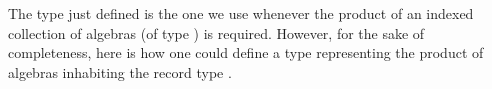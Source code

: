 \ccpad
The type just defined is the one we use whenever the product of an indexed collection of algebras (of type ) is required.  However, for the sake of completeness, here is how one could define a type representing the product of algebras inhabiting the record type .
\ccpad
\begin{code}%
\>[0][@{}l@{\AgdaIndent{0}}]%
\>[1]\AgdaSpace{}%
\AgdaSymbol{:}\AgdaSpace{}%
\AgdaSymbol{(}\AgdaSpace{}%
\AgdaSymbol{:}\AgdaSpace{}%
\AgdaSpace{}%
\AgdaSpace{}%
\AgdaSpace{}%
\AgdaSpace{}%
\AgdaSymbol{)}\AgdaSpace{}%
\AgdaSpace{}%
\AgdaSpace{}%
\AgdaSymbol{(}\AgdaSpace{}%
\AgdaSpace{}%
\AgdaSymbol{)}\AgdaSpace{}%
\<%
\\
%
\>[1]\AgdaSpace{}%
\AgdaSpace{}%
\AgdaSymbol{=}\AgdaSpace{}%
%
\>[100I]\AgdaSymbol{\{}\AgdaSpace{}%
\AgdaSpace{}%
\AgdaSymbol{=}\AgdaSpace{}%
\AgdaSpace{}%
\AgdaSpace{}%
\AgdaSpace{}%
\AgdaSpace{}%
\AgdaSymbol{(}\AgdaSpace{}%
\AgdaSymbol{)}\AgdaSpace{}\AgdaSymbol{;}%
\>[55]\<%
\\
\>[100I][@{}l@{\AgdaIndent{0}}]%
\>[15]\AgdaSpace{}%
\AgdaSymbol{=}\AgdaSpace{}%
\AgdaSpace{}%
\AgdaSpace{}%
\AgdaSpace{}%
\AgdaSpace{}%
\AgdaSpace{}%
\AgdaSymbol{(}\AgdaSpace{}%
\AgdaSymbol{(}\AgdaSpace{}%
\AgdaSymbol{))}\AgdaSpace{}%
\AgdaSpace{}%
\AgdaSpace{}%
\AgdaSpace{}%
\AgdaSpace{}%
\AgdaSpace{}%
\AgdaSpace{}%
\AgdaSpace{}\AgdaSymbol{\}}%
\>[55]\<%
\end{code}
